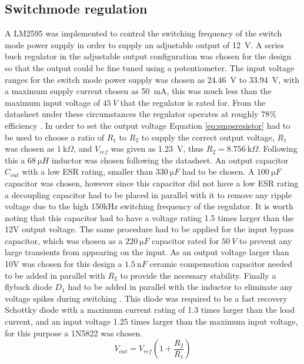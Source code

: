 \subsection{Switchmode regulation}
A LM2595 was implemented to control the switching frequency of the switch mode power supply in order to supply an adjustable output of \SI{12}{V}. A series buck regulator in the adjustable output configuration was chosen for the design so that the output could be fine tuned using a potentiometer. The input voltage ranges for the switch mode power supply was chosen as \SI{24.46}{V} to \SI{33.94}{V}, with a maximum supply current chosen as \SI{50}{\milli A}, this was much less than the maximum input voltage of $\SI{45}{V}$ that the regulator is rated for. From the datasheet under these circumstances the regulator operates at roughly $78\%$ efficiency \cite{lm2593:2013}. In order to set the output voltage Equation \ref{eq:smpsresistor} had to be used to choose a ratio of $R_{1}$ to $R_{2}$ to supply the correct output voltage, $R_{1}$ was chosen as $\SI{1}{\kilo \Omega}$, and $V_{ref}$ was given as \SI{1.23}{V}, thus $R_{2}=\SI{8.756}{\kilo \Omega}$. Following this a $\SI{68}{\micro H}$ inductor was chosen following the datasheet. \vspace{4mm} \newline
An output capacitor $C_{out}$ with a low ESR rating, smaller than $\SI{330}{\micro F}$ had to be chosen. A $\SI{100}{\micro F}$ capacitor was chosen, however since this capacitor did not have a low ESR rating a decoupling capacitor had to be placed in parallel with it to remove any ripple voltage due to the high 150kHz switching frequency of the regulator. It is worth noting that this capacitor had to have a voltage rating 1.5 times larger than the 12V output voltage. The same procedure had to be applied for the input bypass capacitor, which was chosen as a $\SI{220}{\micro F}$ capacitor rated for $\SI{50}{V}$ to prevent any large transients from appearing on the input. As an output voltage larger than 10V was chosen for this design a $\SI{1.5}{\nano F}$ ceramic compensation capacitor needed to be added in parallel with $R_{2}$ to provide the necessary stability. Finally a flyback diode $D_1$ had to be added in parallel with the inductor to eliminate any voltage spikes during switching \cite{WebsiteFlyback}. This diode was required to be a fast recovery Schottky diode with a maximum current rating of 1.3 times larger than the load current, and an input voltage 1.25 times larger than the maximum input voltage, for this purpose a 1N5822 was chosen.
\begin{equation}
   V_{out} = V_{ref}(1+\frac{R_{2}}{R_{1}})
   \label{eq:smpsresistor}
\end{equation} 

